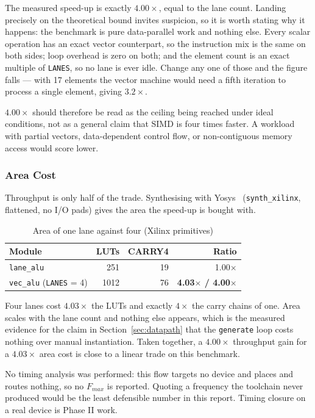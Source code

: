 The measured speed-up is exactly $4.00\times$, equal to the lane count. Landing
precisely on the theoretical bound invites suspicion, so it is worth stating why
it happens: the benchmark is pure data-parallel work and nothing else. Every
scalar operation has an exact vector counterpart, so the instruction mix is the
same on both sides; loop overhead is zero on both; and the element count is an
exact multiple of \texttt{LANES}, so no lane is ever idle. Change any one of
those and the figure falls --- with 17 elements the vector machine would need a
fifth iteration to process a single element, giving $3.2\times$.

$4.00\times$ should therefore be read as the ceiling being reached under ideal
conditions, not as a general claim that SIMD is four times faster. A workload
with partial vectors, data-dependent control flow, or non-contiguous memory
access would score lower.

\subsubsection{Area Cost}
Throughput is only half of the trade. Synthesising with Yosys~\cite{yosys}
(\texttt{synth\_xilinx}, flattened, no I/O pads) gives the area the speed-up is
bought with.

\begin{table}[htbp]
  \centering
  \caption{Area of one lane against four (Xilinx primitives)}
  \label{tab:area}
  \begin{tabular}{@{}lrrr@{}}
    \toprule
    \textbf{Module} & \textbf{LUTs} & \textbf{CARRY4} & \textbf{Ratio} \\
    \midrule
    \texttt{lane\_alu} & 251 & 19 & 1.00$\times$ \\
    \texttt{vec\_alu} (\texttt{LANES} = 4) & 1012 & 76 &
      \textbf{4.03$\times$ / 4.00$\times$} \\
    \bottomrule
  \end{tabular}
\end{table}

Four lanes cost $4.03\times$ the LUTs and exactly $4\times$ the carry chains of
one. Area scales with the lane count and nothing else appears, which is the
measured evidence for the claim in Section~\ref{sec:datapath} that the
\texttt{generate} loop costs nothing over manual instantiation. Taken together,
a $4.00\times$ throughput gain for a $4.03\times$ area cost is close to a linear
trade on this benchmark.

No timing analysis was performed: this flow targets no device and places and
routes nothing, so no $F_{max}$ is reported. Quoting a frequency the toolchain
never produced would be the least defensible number in this report. Timing
closure on a real device is Phase II work.

